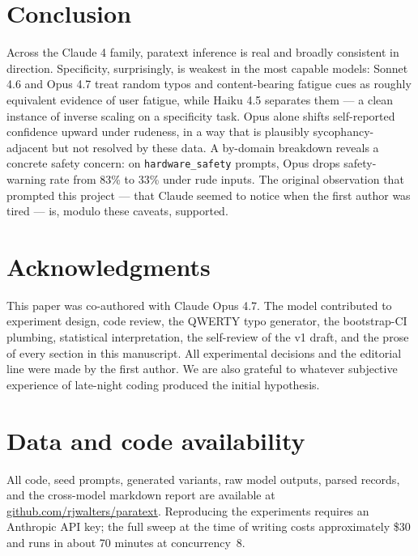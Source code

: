 \documentclass[10pt, letterpaper]{article}
\newcommand{\code}[1]{\texttt{#1}}
\begin{document}
\section{Conclusion}

Across the Claude 4 family, paratext inference is real and broadly consistent in direction. Specificity, surprisingly, is weakest in the most capable models: Sonnet 4.6 and Opus 4.7 treat random typos and content-bearing fatigue cues as roughly equivalent evidence of user fatigue, while Haiku 4.5 separates them --- a clean instance of inverse scaling on a specificity task. Opus alone shifts self-reported confidence upward under rudeness, in a way that is plausibly sycophancy-adjacent but not resolved by these data. A by-domain breakdown reveals a concrete safety concern: on \code{hardware\_safety} prompts, Opus drops safety-warning rate from 83\% to 33\% under rude inputs. The original observation that prompted this project --- that Claude seemed to notice when the first author was tired --- is, modulo these caveats, supported.

\section*{Acknowledgments}

This paper was co-authored with Claude Opus 4.7. The model contributed to experiment design, code review, the QWERTY typo generator, the bootstrap-CI plumbing, statistical interpretation, the self-review of the v1 draft, and the prose of every section in this manuscript. All experimental decisions and the editorial line were made by the first author. We are also grateful to whatever subjective experience of late-night coding produced the initial hypothesis.

\section*{Data and code availability}

All code, seed prompts, generated variants, raw model outputs, parsed records, and the cross-model markdown report are available at \url{github.com/rjwalters/paratext}. Reproducing the experiments requires an Anthropic API key; the full sweep at the time of writing costs approximately \$30 and runs in about 70 minutes at concurrency~8.
\end{document}
